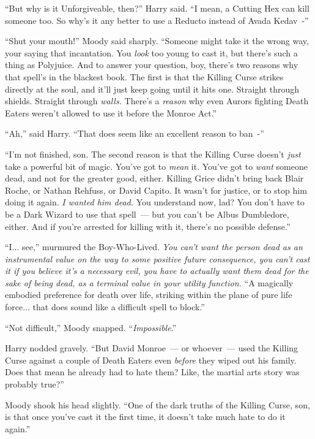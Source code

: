 ``But why is it Unforgiveable, then?'' Harry said. ``I mean, a Cutting Hex can kill someone too. So why's it any better to use a Reducto instead of Avada Kedav~-''

``Shut your mouth!'' Moody said sharply. ``Someone might take it the wrong way, your saying that incantation. You \emph{look} too young to cast it, but there's such a thing as Polyjuice. And to answer your question, boy, there's two reasons why that spell's in the blackest book. The first is that the Killing Curse strikes directly at the soul, and it'll just keep going until it hits one. Straight through shields. Straight through \emph{walls.} There's a \emph{reason} why even Aurors fighting Death Eaters weren't allowed to use it before the Monroe Act.''

``Ah,'' said Harry. ``That does seem like an excellent reason to ban~-''

``I'm not finished, son. The second reason is that the Killing Curse doesn't \emph{just} take a powerful bit of magic. You've got to \emph{mean} it. You've got to \emph{want} someone dead, and not for the greater good, either. Killing Grice didn't bring back Blair Roche, or Nathan Rehfuss, or David Capito. It wasn't for justice, or to stop him doing it again. \emph{I wanted him dead.} You understand now, lad? You don't have to be a Dark Wizard to use that spell~--- but you can't be Albus Dumbledore, either. And if you're arrested for killing with it, there's no possible defense.''

``I... see,'' murmured the Boy-Who-Lived. \emph{You can't want the person dead as an instrumental value on the way to some positive future consequence, you can't cast it if you believe it's a necessary evil, you have to actually want them dead for the sake of being dead, as a terminal value in your utility function.} ``A magically embodied preference for death over life, striking within the plane of pure life force... that does sound like a difficult spell to block.''

``Not difficult,'' Moody snapped. ``\emph{Impossible}.''

Harry nodded gravely. ``But David Monroe~--- or whoever~--- used the Killing Curse against a couple of Death Eaters even \emph{before} they wiped out his family. Does that mean he already had to hate them? Like, the martial arts story was probably true?''

Moody shook his head slightly. ``One of the dark truths of the Killing Curse, son, is that once you've cast it the first time, it doesn't take much hate to do it again.''

